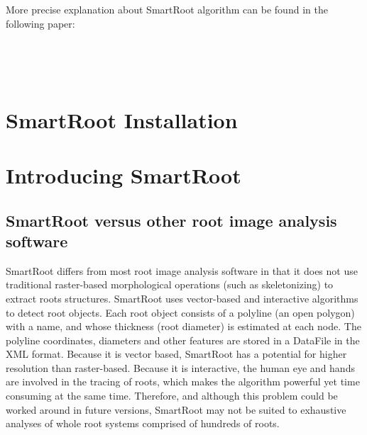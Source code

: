 \documentclass[a4paper,english,10pt]{report}
\begin{document}
More precise explanation about SmartRoot algorithm can be found in the following paper:\\

\noindent {}

~~
\newpage
~~
%


\tableofcontents
\listoffigures


~~
\newpage


\chapter{SmartRoot Installation}
\label{install}




\chapter{Introducing SmartRoot}


{\color{coolSection}\section{SmartRoot versus other root image analysis software}}

SmartRoot differs from most root image analysis software in that it does not use traditional raster-based morphological operations (such as skeletonizing) to extract roots structures. SmartRoot uses vector-based and interactive algorithms to detect root objects. Each root object consists of a polyline (an open polygon) with a name, and whose thickness (root diameter) is estimated at each node. The polyline coordinates, diameters and other features are stored in a DataFile in the XML format. Because it is vector based, SmartRoot has a potential for higher resolution than raster-based. Because it is interactive, the human eye and hands are involved in the tracing of roots, which makes the algorithm powerful yet time consuming at the same time. Therefore, and although this problem could be worked around in future versions, SmartRoot may not be suited to exhaustive analyses of whole root systems comprised of hundreds of roots.\\
\end{document}
